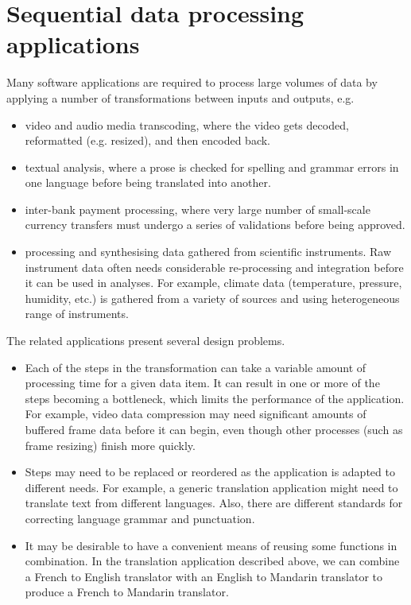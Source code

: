 \documentclass[a4paper, openany]{memoir}
\begin{document}
\section{Sequential data processing applications}
Many software applications are required to process large volumes of data by applying a number of transformations between inputs and outputs, e.g.
\begin{itemize}
    \item video and audio media transcoding, where the video gets decoded, reformatted (e.g. resized), and then encoded back.
    \item textual analysis, where a prose is checked for spelling and grammar errors in one language before being translated into another.
    \item inter-bank payment processing, where very large number of small-scale currency transfers must undergo a series of validations before being approved.
    \item processing and synthesising data gathered from scientific instruments. Raw instrument data often needs considerable re-processing and integration before it can be used in analyses. For example, climate data (temperature, pressure, humidity, etc.) is gathered from a variety of sources and using heterogeneous range of instruments.
\end{itemize}

The related applications present several design problems.
\begin{itemize}
    \item Each of the steps in the transformation can take a variable amount of processing time for a given data item. It can result in one or more of the steps becoming a bottleneck, which limits the performance of the application. For example, video data compression may need significant amounts of buffered frame data before it can begin, even though other processes (such as frame resizing) finish more quickly.
    \item Steps may need to be replaced or reordered as the application is adapted to different needs. For example, a generic translation application might need to translate text from different languages. Also, there are different standards for correcting language grammar and punctuation.
    \item It may be desirable to have a convenient means of reusing some functions in combination. In the translation application described above, we can combine a French to English translator with an English to Mandarin translator to produce a French to Mandarin translator.
\end{itemize}
\end{document}
